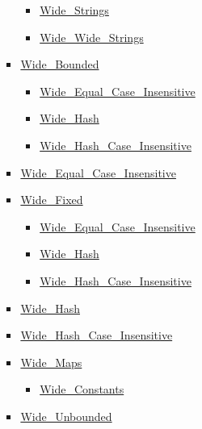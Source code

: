 \begin{multicols*}{\columnnr}
\begin{scriptsize}
\begin{itemize}[leftmargin=0mm]
\begin{itemize}[leftmargin=5mm]
\begin{itemize}[leftmargin=5mm]
\begin{itemize}[leftmargin=5mm]
	  \item[] \href{http://www.ada-auth.org/standards/22rm/html/RM-A-4-11.html}{Wide\_Strings}
	  \item[] \href{http://www.ada-auth.org/standards/22rm/html/RM-A-4-11.html}{Wide\_Wide\_Strings}
	  \end{itemize}
	\item[] \href{http://www.ada-auth.org/standards/22rm/html/RM-A-4-7.html}{Wide\_Bounded}
	  \begin{itemize}[leftmargin=5mm]
	  \item[] \href{http://www.ada-auth.org/standards/22rm/html/RM-A-4-7.html}{Wide\_Equal\_Case\_Insensitive}
	  \item[] \href{http://www.ada-auth.org/standards/22rm/html/RM-A-4-7.html}{Wide\_Hash}
	  \item[] \href{http://www.ada-auth.org/standards/22rm/html/RM-A-4-7.html}{Wide\_Hash\_Case\_Insensitive}
	  \end{itemize}
	\item[] \href{http://www.ada-auth.org/standards/22rm/html/RM-A-4-7.html}{Wide\_Equal\_Case\_Insensitive}
	\item[] \href{http://www.ada-auth.org/standards/22rm/html/RM-A-4-7.html}{Wide\_Fixed}
	  \begin{itemize}[leftmargin=5mm]
	  \item[] \href{http://www.ada-auth.org/standards/22rm/html/RM-A-4-7.html}{Wide\_Equal\_Case\_Insensitive}
	  \item[] \href{http://www.ada-auth.org/standards/22rm/html/RM-A-4-7.html}{Wide\_Hash}
	  \item[] \href{http://www.ada-auth.org/standards/22rm/html/RM-A-4-7.html}{Wide\_Hash\_Case\_Insensitive}
	  \end{itemize}
	\item[] \href{http://www.ada-auth.org/standards/22rm/html/RM-A-4-7.html}{Wide\_Hash}
	\item[] \href{http://www.ada-auth.org/standards/22rm/html/RM-A-4-7.html}{Wide\_Hash\_Case\_Insensitive}
	\item[] \href{http://www.ada-auth.org/standards/22rm/html/RM-A-4-7.html}{Wide\_Maps}
	  \begin{itemize}[leftmargin=5mm]
	  \item[] \href{http://www.ada-auth.org/standards/22rm/html/RM-A-4-7.html}{Wide\_Constants}
	  \end{itemize}
	\item[] \href{http://www.ada-auth.org/standards/22rm/html/RM-A-4-7.html}{Wide\_Unbounded}

\end{itemize}
\end{itemize}
\end{itemize}
\end{scriptsize}
\end{multicols*}
